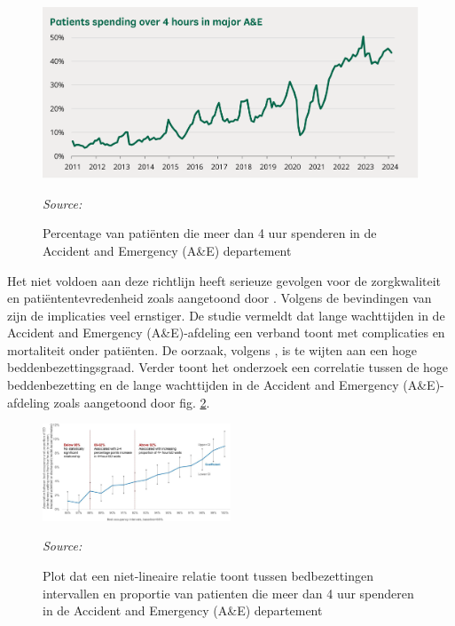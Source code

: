 \begin{figure}[h]
    \centering
    \includegraphics[width=1\linewidth]{img/Figuur-1.png}
    \caption{Percentage van patiënten die meer dan 4 uur spenderen in de Accident and Emergency (A\&E) departement}
    \label{fig:Figuur1}
    \textit{Source: \autocite{Baker2024}}
\end{figure}

Het niet voldoen aan deze richtlijn heeft serieuze gevolgen voor de zorgkwaliteit en patiëntentevredenheid zoals aangetoond door \autocite{Vainieri2020}. Volgens de bevindingen van \autocite{Paling2020} zijn de implicaties veel ernstiger. De studie vermeldt dat lange wachttijden in de Accident and Emergency (A\&E)-afdeling een verband toont met complicaties en mortaliteit onder patiënten. De oorzaak, volgens \autocite{Paling2020}, is te wijten aan een hoge beddenbezettingsgraad. Verder toont het onderzoek een correlatie tussen de hoge beddenbezetting  en de lange wachttijden in de Accident and Emergency (A\&E)-afdeling zoals aangetoond door fig. \ref{fig:Figuur2}.

\begin{figure}[h]
    \centering
    \includegraphics[width=0.5\textwidth]{img/Figuur-2}
    \caption{Plot dat een niet-lineaire relatie toont tussen bedbezettingen intervallen en proportie van patienten die meer dan 4 uur spenderen in de Accident and Emergency (A\&E) departement}
    \label{fig:Figuur2}
    \textit{Source: \autocite{Paling2020}}
\end{figure}

